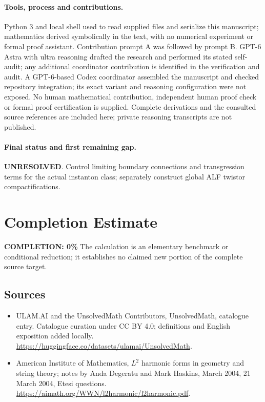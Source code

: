 \documentclass[11pt]{article}
\begin{document}
\paragraph{Tools, process and contributions.}
Python 3 and local shell used to read supplied files and serialize this manuscript; mathematics derived symbolically in the text, with no numerical experiment or formal proof assistant. Contribution prompt A was followed by prompt B. GPT-6 Astra with ultra reasoning drafted the research and performed its stated self-audit; any additional coordinator contribution is identified in the verification and audit. A GPT-6-based Codex coordinator assembled the manuscript and checked repository integration; its exact variant and reasoning configuration were not exposed. No human mathematical contribution, independent human proof check or formal proof certification is supplied. Complete derivations and the consulted source references are included here; private reasoning transcripts are not published.

\paragraph{Final status and first remaining gap.}
\textbf{UNRESOLVED}. Control limiting boundary connections and transgression terms for the actual instanton class; separately construct global ALF twistor compactifications.

\section{Completion Estimate}
\noindent\textbf{COMPLETION: 0\%}
The calculation is an elementary benchmark or conditional reduction; it establishes no claimed new portion of the complete source target.

\subsection{Sources}
\begin{itemize}
\item[\hypertarget{source:statement:1}{S1}] ULAM.AI and the UnsolvedMath Contributors, UnsolvedMath, catalogue entry. Catalogue curation under CC BY 4.0; definitions and English exposition added locally.
\url{https://huggingface.co/datasets/ulamai/UnsolvedMath}.
\item[\hypertarget{source:statement:2}{S2}] American Institute of Mathematics, $L^2$ harmonic forms in geometry and string theory; notes by Anda Degeratu and Mark Haskins, March 2004, 21 March 2004, Etesi questions.
\url{https://aimath.org/WWN/l2harmonic/l2harmonic.pdf}.
\end{itemize}
\label{end:statement}
\end{document}
